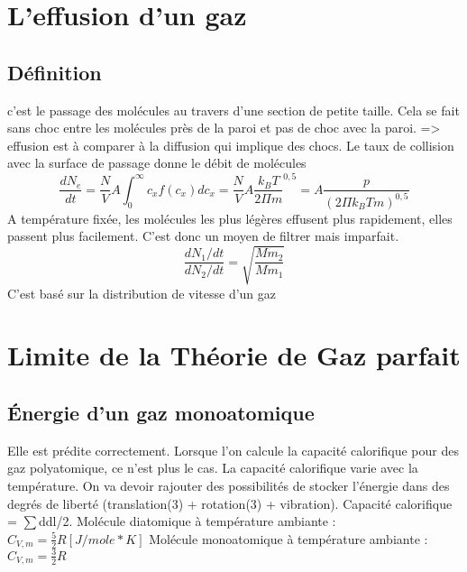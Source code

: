 \documentclass{report}
\begin{document}
\chapter{L'effusion d'un gaz}
\section{Définition}
c'est le passage des molécules au travers d'une section de petite taille.
Cela se fait sans choc entre les molécules près de la paroi et pas de choc avec la paroi. => effusion est à comparer à la diffusion qui implique des chocs. 
Le taux de collision avec la surface de passage donne le débit de molécules
$$\frac{dN_e}{dt}=\frac{N}{V}A\int_{0}^{\infty}{c_xf(c_x)dc_x}=\frac{N}{V}A \frac{k_BT}{2\Pi m}^{0,5}=A\frac{p}{(2\Pi k_B Tm)^{0,5}}$$
A température fixée, les molécules les plus légères effusent plus rapidement, elles passent plus facilement. C'est donc un moyen de filtrer mais imparfait.
$$\frac{dN_1/dt}{dN_2/dt}=\sqrt{\frac{Mm_2}{Mm_1}}$$
C'est basé sur la distribution de vitesse d'un gaz
 
\chapter{Limite de la Théorie de Gaz parfait}
\section{Énergie d'un gaz monoatomique}
Elle est prédite correctement. Lorsque l'on calcule la capacité calorifique pour des gaz polyatomique, ce n'est plus le cas. La capacité calorifique varie avec la température.
On va devoir rajouter des possibilités de stocker l'énergie dans des degrés de liberté (translation(3) + rotation(3) + vibration).
Capacité calorifique = $\sum$ddl/2.
Molécule diatomique à température ambiante : $C_{V,m}=\frac{5}{2}R [J/mole*K]$
Molécule monoatomique à température ambiante : $C_{V,m}=\frac{3}{2}R$
\end{document}
